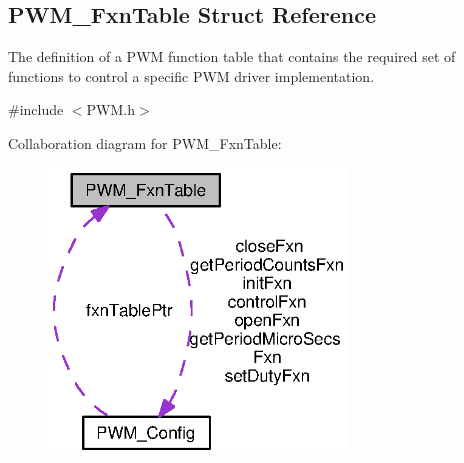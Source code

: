 \subsection{P\+W\+M\+\_\+\+Fxn\+Table Struct Reference}
\label{struct_p_w_m___fxn_table}


The definition of a P\+W\+M function table that contains the required set of functions to control a specific P\+W\+M driver implementation.  




{\ttfamily \#include $<$P\+W\+M.\+h$>$}



Collaboration diagram for P\+W\+M\+\_\+\+Fxn\+Table\+:
\nopagebreak
\begin{figure}[H]
\begin{center}
\leavevmode
\includegraphics[width=225pt]{struct_p_w_m___fxn_table__coll__graph}
\end{center}
\end{figure}
